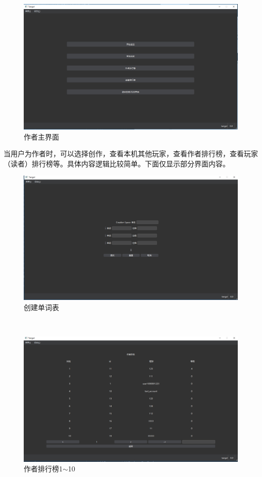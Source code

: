 \documentclass[UTF8]{ctexart}
\begin{document}
\newpage
\begin{figure}[!ht]
    \centering
    \includegraphics[scale=0.3]{./images/ause.png}
    \caption{作者主界面}
\end{figure}
\newpage
\indent 当用户为作者时，可以选择创作，查看本机其他玩家，查看作者排行榜，查看玩家（读者）排行榜等。具体内容逻辑比较简单。下面仅显示部分界面内容。\\
\begin{figure}[!ht]
    \centering
    \includegraphics[scale=0.3]{./images/smdc.png}
    \caption{创建单词表}
\end{figure}\ \\
\newpage
\begin{figure}[!ht]
    \centering
    \includegraphics[scale=0.3]{./images/aurk1.png}
    \caption{作者排行榜1$\sim$10}
\end{figure}\ \\
\end{document}
